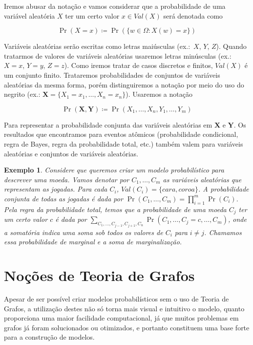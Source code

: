 \documentclass{amsart}
\theoremstyle{plain}
\newcounter{dummy-def}\numberwithin{dummy-def}{subsection}
\newcounter{dummy-thm}\numberwithin{dummy-thm}{subsection}
\newcounter{dummy-prop}\numberwithin{dummy-prop}{subsection}
\newcounter{dummy-ex}\numberwithin{dummy-ex}{subsection}
\newcounter{dummy-eg}\numberwithin{dummy-eg}{subsection}
\newtheorem{example}[dummy-eg]{Exemplo}
\numberwithin{equation}{subsection}
\begin{document}
Iremos abusar da notação e vamos considerar que a probabilidade de uma variável aleatória $X$ ter
um certo valor $x\in Val(X)$ será denotada como

\begin{equation*}
  \Pr(X=x) \coloneqq \Pr(\{w\in\Omega : X(w)=x\})
\end{equation*}

Variáveis aleatórias serão escritas como letras maiúsculas (ex.:\ $X$, $Y$, $Z$). Quando tratarmos
de valores de variáveis aleatórias usaremos letras minúsculas (ex.:\ $X=x$, $Y=y$, $Z=z$). Como
iremos tratar de casos discretos e finitos, $Val(X)$ é um conjunto finito. Trataremos
probabilidades de conjuntos de variáveis aleatórias da mesma forma, porém distinguiremos a notação
por meio do uso do negrito (ex.: $\mathbf{X}=\{X_1=x_1,\ldots,X_n=x_n\}$). Usaremos a notação

\begin{equation*}
  \Pr(\mathbf{X},\mathbf{Y}) \coloneqq \Pr(X_1,\ldots,X_n,Y_1,\ldots,Y_m)
\end{equation*}

Para representar a probabilidade conjunta das variáveis aleatórias em $\mathbf{X}$ e $\mathbf{Y}$.
Os resultados que encontramos para eventos atômicos (probabilidade condicional, regra de Bayes,
regra da probabilidade total, etc.) também valem para variáveis aleatórias e conjuntos de variáveis
aleatórias.

\begin{example}
  Considere que queremos criar um modelo probabilístico para descrever uma moeda. Vamos denotar por
  $C_1,\ldots,C_m$ as variáveis aleatórias que representam as jogadas. Para cada $C_i$,
  $Val(C_i)=\{cara,coroa\}$. A probabilidade conjunta de todas as jogadas é dada por $\Pr(C_1,
  \ldots,C_m)=\prod_{i=1}^m \Pr(C_i)$. Pela regra da probabilidade total, temos que a probabilidade
  de uma moeda $C_j$ ter um certo valor $c$ é dada por $\sum_{C_1,\ldots,C_{j-1},C_{j+1},C_n}
  \Pr(C_1,\ldots,C_j=c,\ldots,C_m)$, onde a somatória indica uma soma sob todos os valores
  de $C_i$ para $i\neq j$. Chamamos essa probabilidade de marginal e a soma de marginalização.
\end{example}

\section{Noções de Teoria de Grafos}

Apesar de ser possível criar modelos probabilísticos sem o uso de Teoria de Grafos, a utilização
destes não só torna mais visual e intuitivo o modelo, quanto proporciona uma maior facilidade
computacional, já que muitos problemas em grafos já foram solucionados ou otimizados, e portanto
constituem uma base forte para a construção de modelos.
\end{document}
